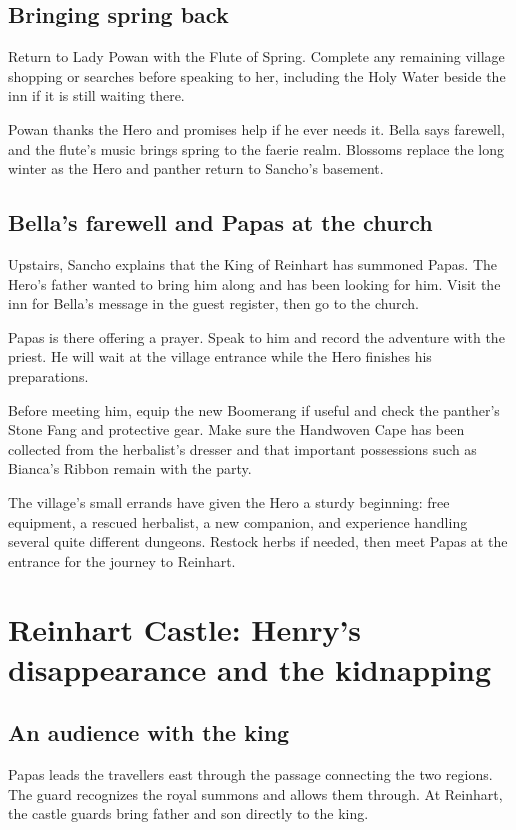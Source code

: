 \subsection*{Bringing spring back}

Return to Lady Powan with the Flute of Spring. Complete any remaining
village shopping or searches before speaking to her, including the
Holy Water beside the inn if it is still waiting there.

Powan thanks the Hero and promises help if he ever needs it. Bella says
farewell, and the flute's music brings spring to the faerie realm.
Blossoms replace the long winter as the Hero and panther return to
Sancho's basement.

\subsection*{Bella's farewell and Papas at the church}

Upstairs, Sancho explains that the King of Reinhart has summoned Papas.
The Hero's father wanted to bring him along and has been looking for him.
Visit the inn for Bella's message in the guest register, then go to the
church.

Papas is there offering a prayer. Speak to him and record the adventure
with the priest. He will wait at the village entrance while the Hero
finishes his preparations.

Before meeting him, equip the new Boomerang if useful and check the
panther's Stone Fang and protective gear. Make sure the Handwoven Cape
has been collected from the herbalist's dresser and that important
possessions such as Bianca's Ribbon remain with the party.

The village's small errands have given the Hero a sturdy beginning:
free equipment, a rescued herbalist, a new companion, and experience
handling several quite different dungeons. Restock herbs if needed,
then meet Papas at the entrance for the journey to Reinhart.

\section{Reinhart Castle: Henry's disappearance and the kidnapping}

\subsection*{An audience with the king}

Papas leads the travellers east through the passage connecting the two
regions. The guard recognizes the royal summons and allows them through.
At Reinhart, the castle guards bring father and son directly to the king.


